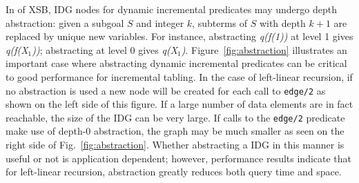 In \version{} of XSB, IDG nodes for dynamic incremental predicates may
undergo depth abstraction: given a subgoal $S$ and integer $k$,
subterms of $S$ with depth $k+1$ are replaced by unique new variables.
For instance, abstracting
{\em q(f(1))} at level 1 gives {\em q(f(X$_1$))}; abstracting at level
0 gives {\em q(X$_1$)}.
%
Figure~\ref{fig:abstraction} illustrates an important case where
abstracting dynamic incremental predicates can be critical to good
performance for incremental tabling.  In the case of left-linear
recursion, if no abstraction is used a new node will be created for
each call to {\tt edge/2} as shown on the left side of this figure.
If a large number of data elements are in fact reachable, the size of
the IDG can be very large.  If calls to the {\tt edge/2} predicate
make use of depth-0 abstraction, the graph may be much smaller as seen
on the right side of Fig.~\ref{fig:abstraction}.  Whether abstracting
a IDG in this manner is useful or not is application dependent;
however, performance results indicate that for left-linear recursion,
abstraction greatly reduces both query time and space.

